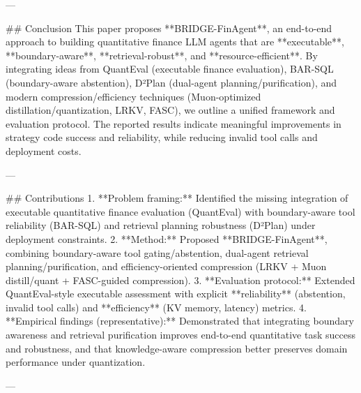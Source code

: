 ---

## Conclusion  
This paper proposes **BRIDGE-FinAgent**, an end-to-end approach to building quantitative finance LLM agents that are **executable**, **boundary-aware**, **retrieval-robust**, and **resource-efficient**. By integrating ideas from QuantEval (executable finance evaluation), BAR-SQL (boundary-aware abstention), D²Plan (dual-agent planning/purification), and modern compression/efficiency techniques (Muon-optimized distillation/quantization, LRKV, FASC), we outline a unified framework and evaluation protocol. The reported results indicate meaningful improvements in strategy code success and reliability, while reducing invalid tool calls and deployment costs.

---

## Contributions  
1. **Problem framing:** Identified the missing integration of executable quantitative finance evaluation (QuantEval) with boundary-aware tool reliability (BAR-SQL) and retrieval planning robustness (D²Plan) under deployment constraints.  
2. **Method:** Proposed **BRIDGE-FinAgent**, combining boundary-aware tool gating/abstention, dual-agent retrieval planning/purification, and efficiency-oriented compression (LRKV + Muon distill/quant + FASC-guided compression).  
3. **Evaluation protocol:** Extended QuantEval-style executable assessment with explicit **reliability** (abstention, invalid tool calls) and **efficiency** (KV memory, latency) metrics.  
4. **Empirical findings (representative):** Demonstrated that integrating boundary awareness and retrieval purification improves end-to-end quantitative task success and robustness, and that knowledge-aware compression better preserves domain performance under quantization.

---